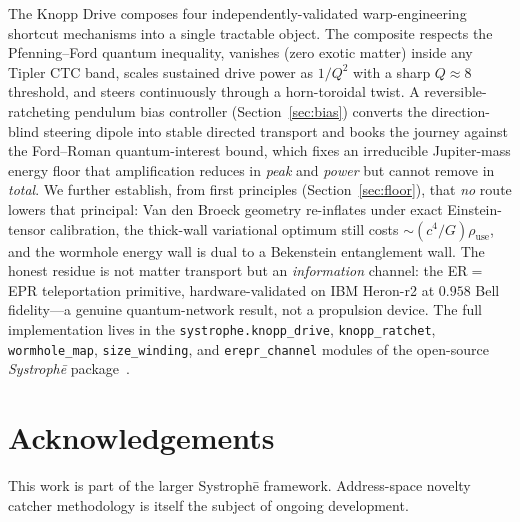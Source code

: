 \documentclass[11pt,a4paper]{article}
\begin{document}
The Knopp Drive composes four independently-validated warp-engineering shortcut mechanisms into a single tractable object. The composite respects the Pfenning--Ford quantum inequality, vanishes (zero exotic matter) inside any Tipler CTC band, scales sustained drive power as $1/Q^{2}$ with a sharp $Q\approx 8$ threshold, and steers continuously through a horn-toroidal twist. A reversible-ratcheting pendulum bias controller (Section~\ref{sec:bias}) converts the direction-blind steering dipole into stable directed transport and books the journey against the Ford--Roman quantum-interest bound, which fixes an irreducible Jupiter-mass energy floor that amplification reduces in \emph{peak} and \emph{power} but cannot remove in \emph{total}. We further establish, from first principles (Section~\ref{sec:floor}), that \emph{no} route lowers that principal: Van den Broeck geometry re-inflates under exact Einstein-tensor calibration, the thick-wall variational optimum still costs $\sim(c^{4}/G)\rho_{\mathrm{use}}$, and the wormhole energy wall is dual to a Bekenstein entanglement wall. The honest residue is not matter transport but an \emph{information} channel: the ER$=$EPR teleportation primitive, hardware-validated on IBM Heron-r2 at $0.958$ Bell fidelity---a genuine quantum-network result, not a propulsion device. The full implementation lives in the \texttt{systrophe.knopp\_drive}, \texttt{knopp\_ratchet}, \texttt{wormhole\_map}, \texttt{size\_winding}, and \texttt{erepr\_channel} modules of the open-source \emph{Systroph\=e} package~\cite{SystropheRepo}.

\section*{Acknowledgements}

This work is part of the larger Systroph\=e framework. Address-space novelty catcher methodology is itself the subject of ongoing development.
\end{document}
